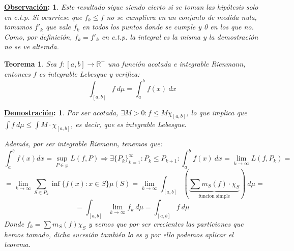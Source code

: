 \documentclass[10pt,a4paper,openright]{book}
\theoremstyle{break}
\newtheorem*{theo}{Teorema}
\newtheorem*{demo}{\underline{Demostración}:}
\newtheorem*{obs}{\underline{Observación}:}
\begin{document}
\begin{obs}
Este resultado sigue siendo cierto si se toman las hipótesis solo en c.t.p. Si ocurriese que $f_k \leq f$ no se cumpliera en un conjunto de medida nula, tomamos $f'_k$ que vale $f_k$ en todos los puntos donde se cumple y 0 en los que no. Como, por definición, $f_k = f'_k$ en c.t.p. la integral es la misma y la demostración no se ve alterada.
\end{obs}

\begin{theo}
Sea $f: \left[a, b\right] \rightarrow \mathbb{R}^+$ una función acotada e integrable Rienmann, entonces $f$ es integrable Lebesgue y verifica:
$$\int_{\left[a, b\right]}f \ d \mu = \int_a^b f\left(x\right)\ dx$$
\end{theo}
\begin{demo}
Por ser acotada, $\exists M > 0: f \le M\chi_{\left[a, b\right]}$, lo que implica que $\int f \ d \mu \leq \int M \cdot \chi_{[a,b]}$, es decir, que es integrable Lebesgue.

Además, por ser integrable Riemann, tenemos que:
$$\int_a^b f\left(x\right)dx = \sup_{P \in \wp} L\left(f, P\right) \Rightarrow \exists \{P_k\}_{k=1}^{\infty} : P_k \leq P_{k+1} : \int_a^b f\left(x\right) \ dx = \lim_{k\rightarrow \infty} L\left(f, P_k\right) = $$
$$= \lim_{k\rightarrow\infty} \sum_{S \in P_k} \inf \{f\left(x\right) : x \in S\}\mu\left(S\right) = \lim_{k\rightarrow\infty} \int_{\left[a, b\right]}\left(\underbrace{\sum m_S \left(f\right) \cdot \chi_S}_{\text{funcion simple}}\right) \ d \mu = $$
$$= \int_{\left[a, b\right]}\lim_{k\rightarrow\infty} f_k \ d \mu = \int_{\left[a, b\right]}f \ d \mu$$
Donde $f_k = \sum m_S\left(f\right) \chi_S$ y vemos que por ser crecientes las particiones que hemos tomado, dicha sucesión también lo es y por ello podemos aplicar el teorema.
\end{demo}
\end{document}
